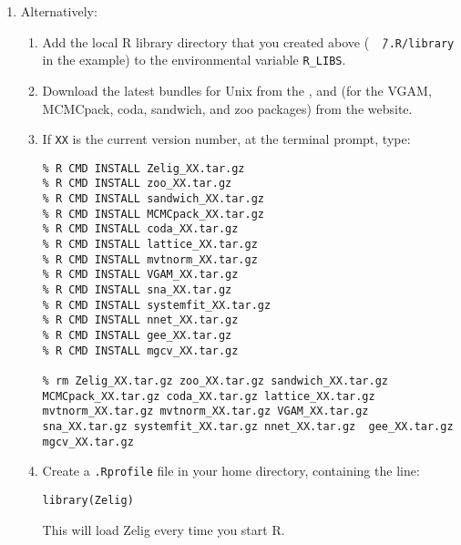 \documentclass{article}
\begin{document}
\begin{enumerate}
\item \label{unix.manual} Alternatively: 
  \begin{enumerate}
  \item Add the local R library directory that you created above ({\tt
      \~\,/.R/library} in the example) to the environmental variable
    {\tt R\_LIBS}.
  \item Download the latest bundles for Unix from the , and (for
    the VGAM, MCMCpack, coda, sandwich, and zoo packages) from the
    website.
  \item If {\tt XX} is the current version number, at the terminal
    prompt, type:
\begin{verbatim}
% R CMD INSTALL Zelig_XX.tar.gz
% R CMD INSTALL zoo_XX.tar.gz
% R CMD INSTALL sandwich_XX.tar.gz
% R CMD INSTALL MCMCpack_XX.tar.gz
% R CMD INSTALL coda_XX.tar.gz
% R CMD INSTALL lattice_XX.tar.gz
% R CMD INSTALL mvtnorm_XX.tar.gz
% R CMD INSTALL VGAM_XX.tar.gz
% R CMD INSTALL sna_XX.tar.gz
% R CMD INSTALL systemfit_XX.tar.gz
% R CMD INSTALL nnet_XX.tar.gz
% R CMD INSTALL gee_XX.tar.gz
% R CMD INSTALL mgcv_XX.tar.gz

% rm Zelig_XX.tar.gz zoo_XX.tar.gz sandwich_XX.tar.gz MCMCpack_XX.tar.gz coda_XX.tar.gz lattice_XX.tar.gz mvtnorm_XX.tar.gz mvtnorm_XX.tar.gz VGAM_XX.tar.gz sna_XX.tar.gz systemfit_XX.tar.gz nnet_XX.tar.gz  gee_XX.tar.gz mgcv_XX.tar.gz
\end{verbatim}
\item Create a {\tt .Rprofile} file in your home directory, containing the line:  
\begin{verbatim}
library(Zelig)
\end{verbatim}
This will load Zelig every time you start R.  
  \end{enumerate}
\end{enumerate}
\end{document}
